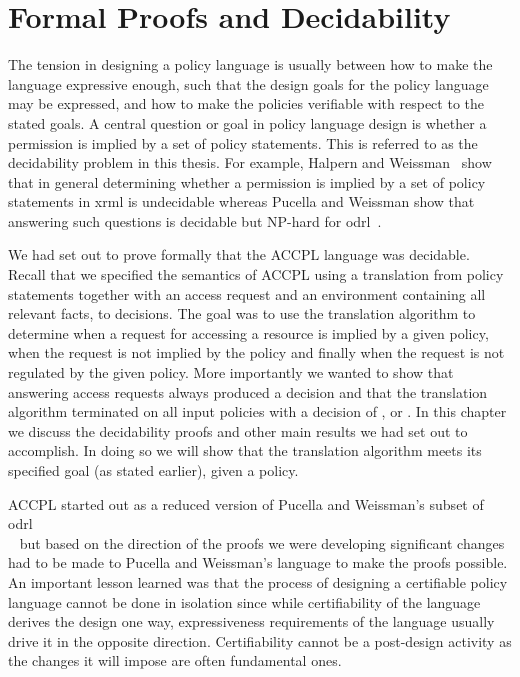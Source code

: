 \chapter{Formal Proofs and Decidability}\label{chap:results}

                  
The tension in designing a policy language is usually between how to make the language expressive enough, such that the design goals for the policy language may be expressed, and how to make the policies verifiable with respect to the stated goals. A central question or goal in policy language design is whether a permission is implied by a set of policy statements. This is referred to as the decidability problem in this thesis. For example, Halpern and Weissman~\cite{HalpernW08} show that in general determining whether a permission is implied by a set of policy statements in \ac{xrml} is undecidable whereas Pucella and Weissman show that answering such questions is decidable but NP-hard for \ac{odrl}~\cite{pucella2006}.
 

We had set out to prove formally that the \ac{ACCPL} language was decidable. Recall that we specified the semantics of \ac{ACCPL} using a translation from policy statements together with an access request and an environment containing all relevant facts, to decisions. The goal was to use the translation algorithm to determine when a request for accessing a resource is implied by a given policy, when the request is not implied by the policy and finally when the request is not regulated by the given policy. More importantly we wanted to show that answering access requests always produced a decision and that the translation algorithm terminated on all input policies with a decision of ,  or . In this chapter we discuss the decidability proofs and other main results we had set out to accomplish. In doing so we will show that the translation algorithm meets its specified goal (as stated earlier), given a policy. 


\ac{ACCPL} started out as a reduced version of Pucella and Weissman's subset of \ac{odrl}\\~\cite{pucella2006} but based on the direction of the proofs we were developing significant changes had to be made to Pucella and Weissman's language to make the proofs possible. An important lesson learned was that the process of designing a certifiable policy language cannot be done in isolation since while certifiability of the language derives the design one way, expressiveness requirements of the language usually drive it in the opposite direction. Certifiability cannot be a post-design activity as the changes it will impose are often fundamental ones.

